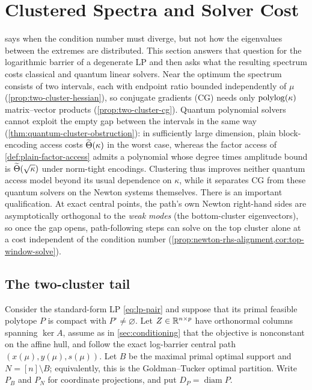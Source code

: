 \section{Clustered Spectra and Solver Cost}
\label{sec:spectra}

 says when the condition number must diverge,
but not how the eigenvalues between the extremes are distributed.  This
section answers that question for the logarithmic barrier of a degenerate LP
and then asks what the resulting spectrum costs classical and quantum linear
solvers.  Near the optimum the spectrum consists of two intervals, each with
endpoint ratio bounded independently of $\mu$
(\cref{prop:two-cluster-hessian}), so conjugate gradients (CG) needs only
$\operatorname{polylog}(\kappa)$ matrix--vector products (\cref{prop:two-cluster-cg}).
Quantum polynomial solvers cannot exploit the empty gap between the
intervals in the same way (\cref{thm:quantum-cluster-obstruction}): in
sufficiently large dimension, plain block-encoding access costs
$\widetilde{\Theta}(\kappa)$ in the worst case, whereas the factor access of
\cref{def:plain-factor-access} admits a polynomial whose degree times
amplitude bound is $\widetilde{\Theta}(\sqrt\kappa)$ under norm-tight encodings.
Clustering thus improves neither quantum access model beyond its usual
dependence on $\kappa$, while it separates CG from these quantum solvers on
the Newton systems themselves.  There is an important qualification.  At
exact central points, the path's own Newton right-hand sides are
asymptotically orthogonal to the \emph{weak modes} (the bottom-cluster
eigenvectors), so once the gap opens, path-following steps can solve on the
top cluster alone at a cost independent of the condition number
(\cref{prop:newton-rhs-alignment,cor:top-window-solve}).

\subsection{The two-cluster tail}
\label{sec:spectra-two-cluster}

Consider the standard-form LP \eqref{eq:lp-pair} and suppose that its primal
feasible polytope $P$ is compact with $P^\circ\ne\varnothing$.  Let
$Z\in\mathbb{R}^{n\times p}$ have orthonormal columns spanning $\ker A$, assume as
in \cref{sec:conditioning} that the objective is nonconstant on the affine
hull, and follow
the exact log-barrier central path $(x(\mu),y(\mu),s(\mu))$.  Let $B$ be the
maximal primal optimal support and $N=[n]\setminus B$; equivalently, this is
the Goldman--Tucker optimal partition.  Write $P_B$ and $P_N$ for coordinate
projections, and put $D_P=\operatorname{diam}P$.


